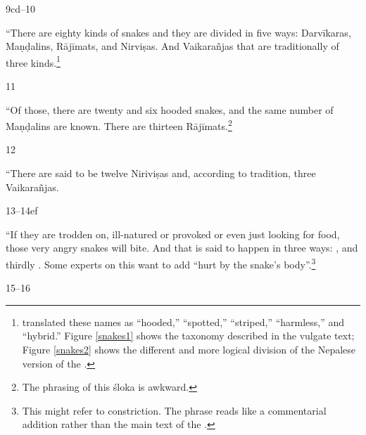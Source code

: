     \begin{translation}
        \item[9cd--10]    
        
        “There are eighty kinds of snakes and they are divided in five ways:
        Darvīkaras, Maṇḍalins, Rājīmats, and Nirviṣas.  And Vaikarañjas that are
        traditionally of three kinds.\footnote{\citet{hari-2011} translated these
            names as “hooded,” “spotted,” “striped,” “harmless,” and “hybrid.” Figure 
            \ref{snakes1} shows the taxonomy described in the vulgate text; Figure 
            \ref{snakes2} shows the different and more logical division of the Nepalese 
            version of the \SS.}
            
    \item [11] 
    
    “Of those, there are twenty and six hooded snakes, and the same number
of Maṇḍalins are known.  There are thirteen Rājīmats.\footnote{The phrasing of
    this śloka is awkward.}
    
    \item [12]
    
    “There are said to be twelve Niriviṣas and, according to tradition, three 
    Vaikarañjas.
    
    \item [13--14ef]
    
“If they are trodden on, ill-natured or provoked or even just looking for
food, those very angry snakes will bite.  And that is said to happen in
three ways: ,  and thirdly
.  Some experts on this want to add “hurt by the
snake's body”.\footnote{This might refer to constriction.  The phrase reads
    like a commentarial addition rather than the main text of the \SS.}

\item[15--16]


\end{translation}
